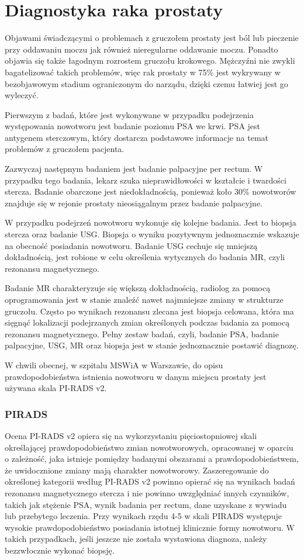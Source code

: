 \documentclass[a4paper,11pt,twoside]{report}
\theoremstyle{definition}
\begin{document}
\section{Diagnostyka raka prostaty}
Objawami świadczącymi o problemach z gruczołem prostaty jest ból lub pieczenie przy oddawaniu moczu jak również nieregularne oddawanie moczu. Ponadto objawia się także łagodnym rozrostem gruczołu krokowego. Mężczyźni nie zwykli bagatelizować takich problemów, więc rak prostaty w 75\% jest wykrywany w bezobjawowym stadium ograniczonym do narządu, dzięki czemu łatwiej jest go wyleczyć. 
\par
Pierwszym z badań, które jest wykonywane w przypadku podejrzenia występowania nowotworu jest badanie poziomu PSA we krwi. PSA jest antygenem sterczowym, który dostarcza podstawowe informacje na temat problemów z gruczołem pacjenta.
\par
Zazwyczaj następnym badaniem jest badanie palpacyjne per rectum. W przypadku tego badania, lekarz szuka nieprawidłowości w kształcie i twardości stercza. Badanie obarczone jest niedokładnością, ponieważ koło 30\% nowotworów znajduje się w rejonie prostaty nieosiągalnym przez badanie palpacyjne. 
\par
W przypadku podejrzeń nowotworu wykonuje się kolejne badania. Jest to biopsja stercza oraz badanie USG. Biopsja o wyniku pozytywnym jednoznacznie wskazuje na obecność posiadania nowotworu. Badanie USG cechuje się mniejszą dokładnością,  jest robione w celu określenia wytycznych do badania MR, czyli rezonansu magnetycznego.
\par
Badanie MR charakteryzuje się większą dokładnością, radiolog za pomocą oprogramowania jest w stanie znaleźć nawet najmniejsze zmiany w strukturze gruczołu. Często po wynikach rezonansu zlecana jest biopsja celowana, która ma sięgnąć lokalizacji podejrzanych zmian określonych podczas badania za pomocą rezonansu magnetycznego. 
Pełny zestaw badań, czyli, badanie PSA, badanie palpacyjne, USG, MR oraz biopsja jest w stanie jednoznacznie postawić diagnozę.
\par
W chwili obecnej, w szpitalu MSWiA w Warszawie, do opisu prawdopodobieństwa istnienia nowotworu w danym miejscu prostaty jest używana skala PI-RADS v2.

\subsubsection{PIRADS} 
Ocena PI-RADS v2 opiera się na wykorzystaniu pięciostopniowej skali określającej prawdopodobieństwo zmian nowotworowych, opracowanej w oparciu o zależność, jaka istnieje pomiędzy badanymi obszarami a prawdopodobieństwem, że uwidocznione zmiany mają charakter nowotworowy. Zaszeregowanie do określonej kategorii według PI-RADS v2 powinno opierać się na wynikach badań rezonansu magnetycznego stercza i nie powinno uwzględniać innych czynników, takich jak stężenie PSA, wynik badania per rectum, dane uzyskane z wywiadu lub przebytego leczenia. Przy wynikach rzędu 4-5 w skali PIRADS występuje wysokie prawdopodobieństwo posiadania istotnej klinicznie formy nowotworu. W takich przypadkach, jeśli jeszcze nie została wystawiona diagnoza, należy bezzwłocznie wykonać biopsję.
\end{document}
